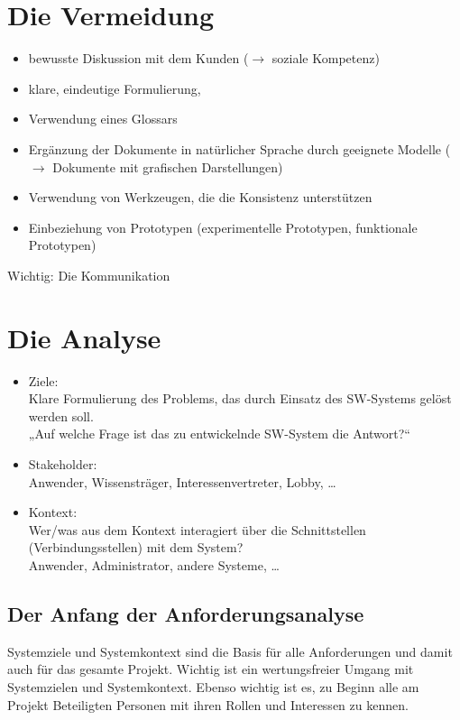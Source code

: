 \documentclass{scrreprt}
\begin{document}
\section{Die Vermeidung}
\begin{itemize}
\item bewusste Diskussion mit dem Kunden ($\to$ soziale Kompetenz)
\item klare, eindeutige Formulierung,
\item Verwendung eines Glossars
\item Ergänzung der Dokumente in natürlicher Sprache durch geeignete Modelle ($\to$ Dokumente mit grafischen Darstellungen)
\item Verwendung von Werkzeugen, die die Konsistenz unterstützen
\item  Einbeziehung von Prototypen (experimentelle Prototypen, funktionale Prototypen)
\end{itemize}
Wichtig: Die Kommunikation

\section{Die Analyse}
\begin{itemize}
\item Ziele:\\
Klare Formulierung des Problems, das durch Einsatz des SW-Systems gelöst werden soll.\\
„Auf welche Frage ist das zu entwickelnde SW-System die Antwort?“
\item Stakeholder:\\
Anwender,
Wissensträger,
Interessenvertreter,
Lobby, …
\item Kontext:\\
Wer/was aus dem Kontext interagiert über die Schnittstellen (Verbindungsstellen) mit dem System?\\
Anwender, Administrator, andere Systeme, …
\end{itemize}


\subsection{Der Anfang der Anforderungsanalyse}

Systemziele und Systemkontext sind die Basis für alle Anforderungen und damit auch für
das gesamte Projekt. Wichtig ist ein wertungsfreier Umgang mit Systemzielen und
Systemkontext. Ebenso wichtig ist es, zu Beginn alle am Projekt Beteiligten Personen mit
ihren Rollen und Interessen zu kennen.
\end{document}
